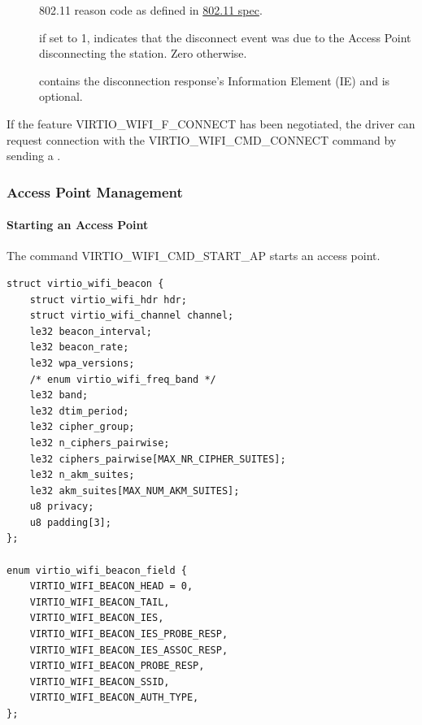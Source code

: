 \begin{description}
\item[] 802.11 reason code as defined in \hyperref[intro:IEEE 802.11]{802.11 spec}.
\item[] if set to 1, indicates that the disconnect event was due to the Access Point disconnecting the station. Zero otherwise.
\item[] contains the disconnection response's Information Element (IE) and is optional.
\end{description}

\label{def:Device Types / 802.11 Device / Device Operation / Connection / VIRTIO_WIFI_CMD_CONNECT}If the feature VIRTIO_WIFI_F_CONNECT has been negotiated, the driver can request connection with the VIRTIO_WIFI_CMD_CONNECT command by sending a .

\subsubsection{Access Point Management}\label{sec:Device Types / 802.11 Device / Device Operation / Access Point Management}

\paragraph{Starting an Access Point}\label{sec:Device Types / 802.11 Device / Device Operation / Access Point Management / Starting an Access Point}

The command VIRTIO_WIFI_CMD_START_AP starts an access point.

\begin{lstlisting}
struct virtio_wifi_beacon {
	struct virtio_wifi_hdr hdr;
	struct virtio_wifi_channel channel;
	le32 beacon_interval;
	le32 beacon_rate;
	le32 wpa_versions;
	/* enum virtio_wifi_freq_band */
	le32 band;
	le32 dtim_period;
	le32 cipher_group;
	le32 n_ciphers_pairwise;
	le32 ciphers_pairwise[MAX_NR_CIPHER_SUITES];
	le32 n_akm_suites;
	le32 akm_suites[MAX_NUM_AKM_SUITES];
	u8 privacy;
	u8 padding[3];
};

enum virtio_wifi_beacon_field {
	VIRTIO_WIFI_BEACON_HEAD = 0,
	VIRTIO_WIFI_BEACON_TAIL,
	VIRTIO_WIFI_BEACON_IES,
	VIRTIO_WIFI_BEACON_IES_PROBE_RESP,
	VIRTIO_WIFI_BEACON_IES_ASSOC_RESP,
	VIRTIO_WIFI_BEACON_PROBE_RESP,
	VIRTIO_WIFI_BEACON_SSID,
	VIRTIO_WIFI_BEACON_AUTH_TYPE,
};
\end{lstlisting}


